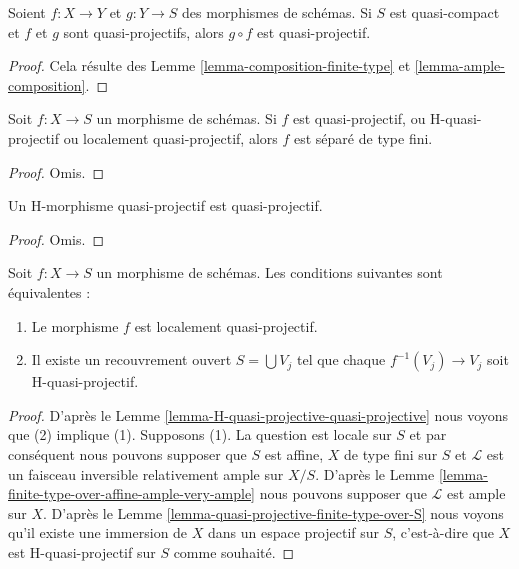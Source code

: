 \begin{lemma}
\label{lemma-composition-quasi-projective}
Soient $f : X \to Y$ et $g : Y \to S$ des morphismes de schémas. Si $S$
est quasi-compact et $f$ et $g$ sont quasi-projectifs,
alors $g \circ f$ est quasi-projectif.
\end{lemma}

\begin{proof}
Cela résulte
des Lemme \ref{lemma-composition-finite-type}
et \ref{lemma-ample-composition}.
\end{proof}

\begin{lemma}
\label{lemma-quasi-projective-properties}
Soit $f : X \to S$ un morphisme de schémas. Si $f$ est quasi-projectif, ou
H-quasi-projectif ou localement quasi-projectif, alors $f$
est séparé de type fini.
\end{lemma}

\begin{proof}
Omis.
\end{proof}

\begin{lemma}
\label{lemma-H-quasi-projective-quasi-projective}
Un H-morphisme quasi-projectif est quasi-projectif.
\end{lemma}

\begin{proof}
Omis.
\end{proof}

\begin{lemma}
\label{lemma-characterize-locally-quasi-projective}
Soit $f : X \to S$ un morphisme de schémas. Les conditions
suivantes sont équivalentes :
\begin{enumerate}
\item Le morphisme $f$ est localement quasi-projectif.
\item Il existe un recouvrement ouvert $S = \bigcup V_j$ tel
que chaque $f^{-1}(V_j) \to V_j$ soit H-quasi-projectif.
\end{enumerate}
\end{lemma}

\begin{proof}
D'après le Lemme \ref{lemma-H-quasi-projective-quasi-projective} nous voyons que (2) implique (1).
Supposons (1). La question est locale sur
$S$ et par conséquent nous pouvons supposer que $S$ est affine,
$X$ de type fini sur
$S$ et $\mathcal{L}$ est un faisceau inversible relativement ample
sur $X/S$. D'après le Lemme \ref{lemma-finite-type-over-affine-ample-very-ample} nous pouvons supposer
que $\mathcal{L}$ est ample sur $X$. D'après
le Lemme \ref{lemma-quasi-projective-finite-type-over-S} nous voyons qu'il existe une immersion de $X$ dans
un espace projectif sur $S$,
c'est-à-dire que $X$ est H-quasi-projectif sur $S$ comme
souhaité.
\end{proof}

